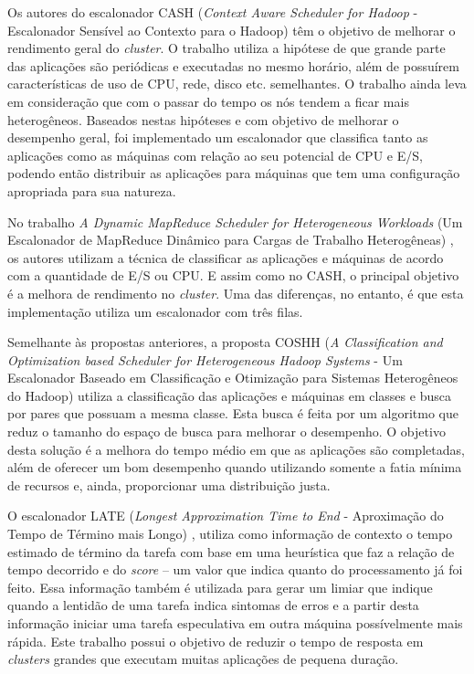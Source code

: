 Os autores do escalonador CASH (\emph{Context Aware Scheduler for Hadoop} - Escalonador Sensível ao Contexto para o Hadoop) \cite{CASH} têm o objetivo de melhorar o rendimento geral do \emph{cluster}. O trabalho utiliza a hipótese de que grande parte das aplicações são periódicas e executadas no mesmo horário, além de possuírem características de uso de CPU, rede, disco etc. semelhantes. O trabalho ainda leva em consideração que com o passar do tempo os nós tendem a ficar mais heterogêneos. Baseados nestas hipóteses e com objetivo de melhorar o desempenho geral, foi implementado um escalonador que classifica tanto as aplicações como as máquinas com relação ao seu potencial de CPU e E/S, podendo então distribuir as aplicações para máquinas que tem uma configuração apropriada para sua natureza.

No trabalho \textit{A Dynamic MapReduce Scheduler for Heterogeneous Workloads} (Um Escalonador de MapReduce Dinâmico para Cargas de Trabalho Heterogêneas) \cite{DMRSHW}, os autores utilizam a técnica de classificar as aplicações e máquinas de acordo com a quantidade de E/S ou CPU. E assim como no CASH, o principal objetivo é a melhora de rendimento no \textit{cluster}. Uma das diferenças, no entanto, é que esta implementação utiliza um escalonador com três filas.

Semelhante às propostas anteriores, a proposta COSHH (\textit{A Classification and Optimization based Scheduler for Heterogeneous Hadoop Systems} - Um Escalonador Baseado em Classificação e Otimização para Sistemas Heterogêneos do Hadoop) \cite{COSHH} utiliza a classificação das aplicações e máquinas em classes e busca por pares que possuam a mesma classe. Esta busca é feita por um algoritmo que reduz o tamanho do espaço de busca para melhorar o desempenho. O objetivo desta solução é a melhora do tempo médio em que as aplicações são completadas, além de oferecer um bom desempenho quando utilizando somente a fatia mínima de recursos e, ainda, proporcionar uma distribuição justa.

O escalonador LATE (\textit{Longest Approximation Time to End} - Aproximação do Tempo de Término mais Longo) \cite{LATE}, utiliza como informação de contexto o tempo estimado de término da tarefa com base em uma heurística que faz a relação de tempo decorrido e do \textit{score} -- um valor que indica quanto do processamento já foi feito. Essa informação também é utilizada para gerar um limiar que indique quando a lentidão de uma tarefa indica sintomas de erros e a partir desta informação iniciar uma tarefa especulativa em outra máquina possívelmente mais rápida. Este trabalho possui o objetivo de reduzir o tempo de resposta em \textit{clusters} grandes que executam muitas aplicações de pequena duração.

